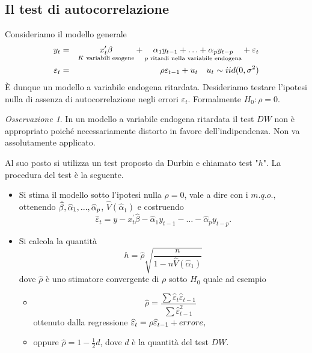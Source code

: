 \documentclass[a4paper]{report}
\newcounter{ese}
\theoremstyle{remark}
\newtheorem{remark}{Osservazione}
\newcounter{theor}
\begin{document}
\subsection{Il test di autocorrelazione}

Consideriamo il modello generale%
\begin{eqnarray}
y_{t} &=&\underset{K\text{ variabili esogene}}{x_{t}^{\prime }\beta }+%
\underset{p\text{ ritardi nella variabile endogena}}{\alpha
_{1}y_{t-1}+\ldots +\alpha _{p}y_{t-p}}+\varepsilon _{t}
\label{k variabili esogene e p} \\
\varepsilon _{t} &=&\rho \varepsilon _{t-1}+u_{t}\ \ \ u_{t}\sim
iid(0,\sigma ^{2})  \notag
\end{eqnarray}%
\`{E} dunque un modello a variabile endogena ritardata. Desideriamo testare
l'ipotesi nulla di assenza di autocorrelazione negli errori $\varepsilon
_{t} $. Formalmente $H_{0}:\rho =0$.

\begin{remark}
In un modello a variabile endogena ritardata il test $DW$ non \`{e}
appropriato poich\'{e} necessariamente distorto in favore dell'indipendenza.
Non va assolutamente applicato.
\end{remark}

Al suo posto si utilizza un test proposto da Durbin e chiamato test "$h$".
La procedura del test \`{e} la seguente.

\begin{itemize}
\item Si stima il modello sotto l'ipotesi nulla $\rho =0$, vale a dire con i 
$m.q.o.,$ ottenendo $\widehat{\beta },\widehat{\alpha }_{1},...,\widehat{%
\alpha }_{p}$, $\widehat{V}(\widehat{\alpha }_{1})$ e costruendo 
\begin{equation*}
\widehat{\varepsilon }_{t}=y-x_{t}^{\prime }\widehat{\beta }-\widehat{\alpha 
}_{1}y_{t-1}-\ldots -\widehat{\alpha }_{p}y_{t-p}.
\end{equation*}

\item Si calcola la quantit\`{a}%
\begin{equation*}
h=\widehat{\rho }\sqrt{\frac{n}{1-n\widehat{V}(\widehat{\alpha }_{1})}}
\end{equation*}%
dove $\widehat{\rho }$ \`{e} uno stimatore convergente di $\rho $ sotto $%
H_{0}$ quale ad esempio

\begin{itemize}
\item 
\begin{equation*}
\widehat{\rho }=\frac{\sum \widehat{\varepsilon }_{t}\widehat{\varepsilon }%
_{t-1}}{\sum \widehat{\varepsilon }_{t-1}^{2}}
\end{equation*}%
ottenuto dalla regressione $\widehat{\varepsilon }_{t}=\rho \widehat{%
\varepsilon }_{t-1}+errore,$

\item oppure $\widehat{\rho }=1-\frac{1}{2}d$, dove $d$ \`{e} la quantit\`{a}
del test $DW$.
\end{itemize}
\end{itemize}
\end{document}
